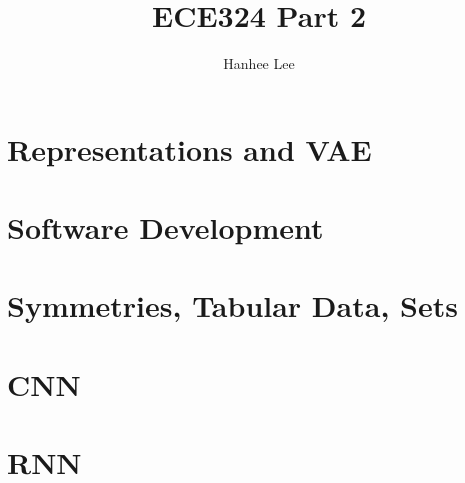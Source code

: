 \documentclass{article}
\title{ECE324 Part 2}
\author{Hanhee Lee}
\begin{document}
\section{Representations and VAE}

\newpage

\section{Software Development}

\newpage

\section{Symmetries, Tabular Data, Sets}

\newpage

\section{CNN}

\newpage

\section{RNN}

\end{document}
